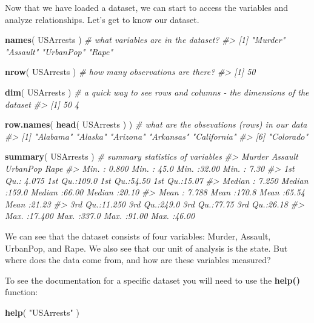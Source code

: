 \documentclass[]{book}
\newenvironment{Shaded}{\begin{snugshade}}{\end{snugshade}}
\newcommand{\CommentTok}[1]{\textcolor[rgb]{0.56,0.35,0.01}{\textit{#1}}}
\newcommand{\KeywordTok}[1]{\textcolor[rgb]{0.13,0.29,0.53}{\textbf{#1}}}
\newcommand{\NormalTok}[1]{#1}
\newcommand{\StringTok}[1]{\textcolor[rgb]{0.31,0.60,0.02}{#1}}
\theoremstyle{definition}
\theoremstyle{definition}
\theoremstyle{definition}
\theoremstyle{remark}
\begin{document}
Now that we have loaded a dataset, we can start to access the variables
and analyze relationships. Let's get to know our dataset.

\begin{Shaded}
\begin{Highlighting}[]

\KeywordTok{names}\NormalTok{( USArrests )  }\CommentTok{# what variables are in the dataset?}
\CommentTok{#> [1] "Murder"   "Assault"  "UrbanPop" "Rape"}

\KeywordTok{nrow}\NormalTok{( USArrests )   }\CommentTok{# how many observations are there?}
\CommentTok{#> [1] 50}

\KeywordTok{dim}\NormalTok{( USArrests )    }\CommentTok{# a quick way to see rows and columns - the dimensions of the dataset}
\CommentTok{#> [1] 50  4}

\KeywordTok{row.names}\NormalTok{( }\KeywordTok{head}\NormalTok{( USArrests ) )   }\CommentTok{# what are the obsevations (rows) in our data}
\CommentTok{#> [1] "Alabama"    "Alaska"     "Arizona"    "Arkansas"   "California"}
\CommentTok{#> [6] "Colorado"}

\KeywordTok{summary}\NormalTok{( USArrests )   }\CommentTok{# summary statistics of variables}
\CommentTok{#>      Murder          Assault         UrbanPop          Rape      }
\CommentTok{#>  Min.   : 0.800   Min.   : 45.0   Min.   :32.00   Min.   : 7.30  }
\CommentTok{#>  1st Qu.: 4.075   1st Qu.:109.0   1st Qu.:54.50   1st Qu.:15.07  }
\CommentTok{#>  Median : 7.250   Median :159.0   Median :66.00   Median :20.10  }
\CommentTok{#>  Mean   : 7.788   Mean   :170.8   Mean   :65.54   Mean   :21.23  }
\CommentTok{#>  3rd Qu.:11.250   3rd Qu.:249.0   3rd Qu.:77.75   3rd Qu.:26.18  }
\CommentTok{#>  Max.   :17.400   Max.   :337.0   Max.   :91.00   Max.   :46.00}
\end{Highlighting}
\end{Shaded}

We can see that the dataset consists of four variables: Murder, Assault,
UrbanPop, and Rape. We also see that our unit of analysis is the state.
But where does the data come from, and how are these variables measured?

To see the documentation for a specific dataset you will need to use the
\textbf{help()} function:

\begin{Shaded}
\begin{Highlighting}[]
\KeywordTok{help}\NormalTok{( }\StringTok{"USArrests"}\NormalTok{ )}
\end{Highlighting}
\end{Shaded}
\end{document}
